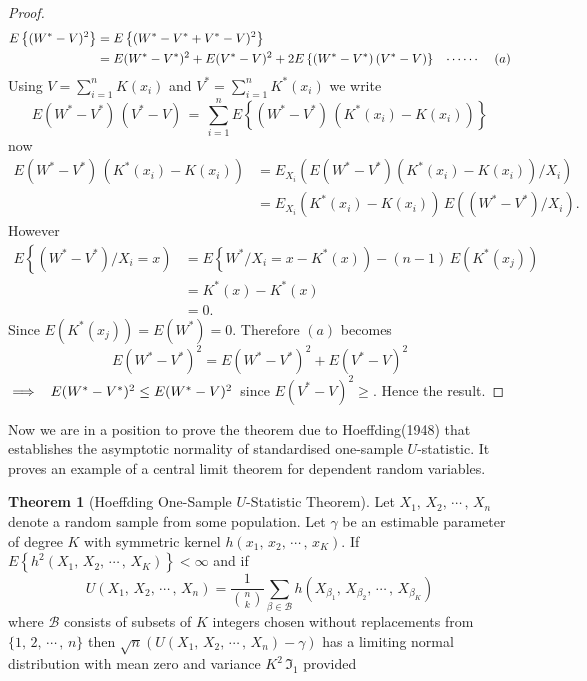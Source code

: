 \documentclass[12pt,a4paper]{report}
\theoremstyle{definition}
\newtheorem{thm}{Theorem}[section]
\theoremstyle{plain}
\begin{document}
\begin{proof}
\begin{align*}
E\left\{(W^* - V)^2\right\} & = E\left\{(W^* - V^* + V^* - V)^2\right\}\\
& = E(W^* - V^*)^2 + E(V^* - V)^2 + 2E\left\{(W^* - V^*)\, (V^* - V)\right\}\hspace{0.3cm} \cdots\cdots\hspace{0.4cm} (a)
\end{align*}
Using $V = \sum^n_{i = 1} K(x_i)$ and $V^* = \sum^n_{i = 1} K^*(x_i)$ we write
$$E(W^* - V^*)\, (V^* - V) \, = \, \sum^n_{i=1}E\left\{(W^* - V^*)\, \left(K^*(x_i) - K(x_i)\right)\right\}$$
now
\begin{align*}
E(W^*  - V^*)\, \left(K^*(x_i) - K(x_i)\right) & = E_{X_i}\left(E(W^* - V^*)\left(K^*(x_i) - K(x_i)\right)\big/X_i\right)\\
& = E_{X_i}\left(K^*(x_i) - K(x_i)\right)\, E\left((W^* - V^*)\big/X_i\right).
\end{align*}
However
\begin{align*}
E\left\{(W^*-V^*)\big/X_i = x\right) & = E\left\{W^*\big/X_i  = x - K^*(x)\right) - (n-1)\, E\left(K^*(x_j)\right)\\
& = K^*(x) - K^*(x)\\
& = 0.
\end{align*}
Since $E\left(K^*(x_j)\right) = E(W^*) = 0$. Therefore $(a)$ becomes
$$E(W^* - V^*)^2 = E(W^* - V^*)^2 + E(V^* - V)^2$$
$\implies\hspace{0.2cm} E(W^* - V^*)^2 \leq E(W^* - V)^2\, $ since $E(V^* -V)^2\geq $. Hence the result.
\end{proof}



Now we are in a position to prove the theorem due to Hoeffding(1948) that establishes the asymptotic normality of standardised one-sample $U$-statistic. It proves an example of a central limit theorem for dependent random variables.

\begin{thm}[Hoeffding One-Sample $U$-Statistic Theorem]
Let $X_1, \, X_2, \, \cdots\, , \, X_n$ denote a random sample from some population. Let $\gamma$ be an estimable parameter of degree $K$ with symmetric kernel $h(x_1, \, x_2, \, \cdots\, , \, x_K)$. If $E\left\{h^2(X_1, \, X_2, \, \cdots\, , \, X_K)\right\} < \infty$ and if 
$$U(X_1, \, X_2, \, \cdots\, , \, X_n) = \frac{1}{\binom{n}{k}}\sum_{\beta\in\mathcal{B}}h(X_{\beta_1}, \, X_{\beta_2}, \, \cdots\, , \, X_{\beta_K})$$
where $\mathcal{B}$ consists of subsets of $K$ integers chosen without replacements from $\{1, \, 2, \, \cdots\, , \, n\}$ then $\sqrt{n}\left(U(X_1, \, X_2, \, \cdots\, , \, X_n)-\gamma\right)$ has a limiting normal distribution with mean zero and variance $K^2\, \Im_1$ provided
\end{thm}
\end{document}
